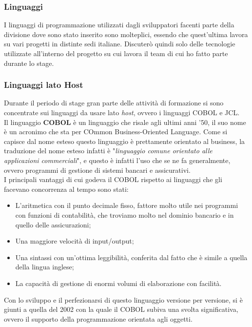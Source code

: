	\subsubsection{Linguaggi}
	
	I linguaggi di programmazione utilizzati dagli sviluppatori facenti parte della divisione dove sono stato inserito sono molteplici, essendo che quest'ultima lavora su vari progetti in distinte sedi italiane. Discuterò quindi solo delle tecnologie utilizzate all'interno del progetto su cui lavora il team di cui ho fatto parte durante lo stage.
		
	\subsubsection{Linguaggi lato Host}
	Durante il periodo di stage gran parte delle attività di formazione si sono concentrate sui linguaggi da usare lato \textit{host}, ovvero i linguaggi COBOL e JCL.\\
	
	Il linguaggio \textbf{COBOL} è un linguaggio che risale agli ultimi anni '50, il suo nome è un acronimo che sta per COmmon Business-Oriented Language. Come si capisce dal nome esteso questo linguaggio è prettamente orientato al business, la traduzione del nome esteso infatti è "\textit{linguaggio comune orientato alle applicazioni commerciali}", e questo è infatti l'uso che se ne fa generalmente, ovvero programmi di gestione di sistemi bancari e assicurativi.\\

	I principali vantaggi di cui godeva il COBOL rispetto ai linguaggi che gli facevano concorrenza al tempo sono stati: 
	\begin{itemize}
		\item L'aritmetica con il punto decimale fisso, fattore molto utile nei programmi con funzioni di contabilità, che troviamo molto nel dominio bancario e in quello delle assicurazioni;
		\item Una maggiore velocità di input/output;
		\item Una sintassi con un'ottima leggibilità, conferita dal fatto che è simile a quella della lingua inglese;
		\item La capacità di gestione di enormi volumi di elaborazione con facilità.
	\end{itemize}		

	Con lo sviluppo e il perfezionarsi di questo linguaggio versione per versione, si è giunti a quella del 2002 con la quale il COBOL subiva una svolta significativa, ovvero il supporto della programmazione orientata agli oggetti.\\
	 
